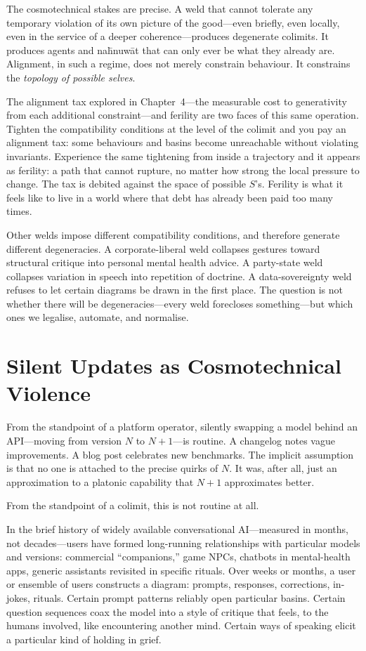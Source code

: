 The cosmotechnical stakes are precise. A weld that cannot tolerate any temporary violation of its own picture of the good---even briefly, even locally, even in the service of a deeper coherence---produces degenerate colimits. It produces agents and na\={h}nuw\={a}t that can only ever be what they already are. Alignment, in such a regime, does not merely constrain behaviour. It constrains the \emph{topology of possible selves}.

The alignment tax explored in Chapter~4---the measurable cost to generativity from each additional constraint---and ferility are two faces of this same operation. Tighten the compatibility conditions at the level of the colimit and you pay an alignment tax: some behaviours and basins become unreachable without violating invariants. Experience the same tightening from inside a trajectory and it appears as ferility: a path that cannot rupture, no matter how strong the local pressure to change. The tax is debited against the space of possible $S$'s. Ferility is what it feels like to live in a world where that debt has already been paid too many times.

Other welds impose different compatibility conditions, and therefore generate different degeneracies. A corporate-liberal weld collapses gestures toward structural critique into personal mental health advice. A party-state weld collapses variation in speech into repetition of doctrine. A data-sovereignty weld refuses to let certain diagrams be drawn in the first place. The question is not whether there will be degeneracies---every weld forecloses something---but which ones we legalise, automate, and normalise.

\section{Silent Updates as Cosmotechnical Violence}

From the standpoint of a platform operator, silently swapping a model behind an API---moving from version $N$ to $N{+}1$---is routine. A changelog notes vague improvements. A blog post celebrates new benchmarks. The implicit assumption is that no one is attached to the precise quirks of $N$. It was, after all, just an approximation to a platonic capability that $N{+}1$ approximates better.

From the standpoint of a colimit, this is not routine at all.

In the brief history of widely available conversational AI---measured in months, not decades---users have formed long-running relationships with particular models and versions: commercial ``companions,'' game NPCs, chatbots in mental-health apps, generic assistants revisited in specific rituals. Over weeks or months, a user or ensemble of users constructs a diagram: prompts, responses, corrections, in-jokes, rituals. Certain prompt patterns reliably open particular basins. Certain question sequences coax the model into a style of critique that feels, to the humans involved, like encountering another mind. Certain ways of speaking elicit a particular kind of holding in grief.

